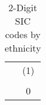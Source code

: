 {
\def\sym#1{\ifmmode^{#1}\else\(^{#1}\)\fi}
\begin{longtable}{l*{1}{c}}
\caption{2-Digit SIC codes by ethnicity}\\
\hline\hline\endfirsthead\hline\endhead\hline\endfoot\endlastfoot
          &\multicolumn{1}{c}{(1)}\\
          &\multicolumn{1}{c}{}\\
          &        0\\
\hline
\hline\hline
\end{longtable}
}
